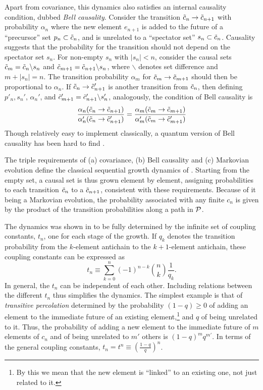 Apart from covariance, this  dynamics also satisfies an internal causality condition, dubbed  \emph{Bell
  causality}.   Consider the transition $\tilde c_n \rightarrow \tilde c_{n+1}$ with probability $\alpha_n$ where  the new element
$e_{n+1}$ is added to the future of a
``precursor''   set $p_n \subset \tilde c_n$, and is unrelated to a ``spectator set'' $s_n \subset \tilde c_n$.  Causality suggests
that the 
probability for the transition should not depend on the spectator set $s_n$.  For non-empty $s_n$ with
$|s_n|<n$,  consider
the causal sets $\tilde c_m=\tilde c_n\backslash s_n$
and $\tilde c_{m+1}=\tilde c_{n+1} \backslash s_n$,  
where $\backslash$ denotes set difference  and $m+|s_n| =n$.  The  transition probability $\alpha_m$ for  $\tilde c_m\rightarrow
\tilde c_{m+1}$   should then be proportional to $\alpha_n$. If $\tilde c_n \rightarrow \tilde c_{n+1}'$ is another transition from $\tilde c_n$, then
defining $p'_n, s_n'$, $ \alpha_n'$, and $\tilde c_{m+1}'=\tilde c_{n+1}'\backslash s_n'$, analogously, the condition of Bell
causality is 
\begin{equation}
\frac{\alpha_n(\tilde c_n \rightarrow \tilde c_{n+1})}{\alpha_n'(\tilde c_n \rightarrow \tilde c_{n+1}')}= \frac{\alpha_m(\tilde c_m \rightarrow
  \tilde c_{m+1})}{\alpha_m'(\tilde c_m \rightarrow \tilde c_{m+1}')} 
\end{equation}
Though relatively easy to implement classically, a quantum version of Bell causality has been hard to find 
\citep{joequantumbell}.    

The triple requirements of (a) covariance, (b) Bell causality and (c) Markovian evolution define the classical
sequential growth dynamics of \cite{csgone}.  Starting from the empty set, a causal set is thus grown element by
element, assigning probabilities to each transition $\tilde c_n$ to a $\tilde c_{n+1}$, consistent with these requirements. Because of
it being a Markovian evolution, the probability associated with any finite $c_n$ is given by the product of the
transition probabilities along a path in $\mathcal P$.   

The dynamics was shown in \cite{csg} to be  fully determined by the infinite set of coupling constants, $t_n$, one for
each stage of the growth. If  $q_k$ denotes  the transition probability from  the $k$-element antichain to the $k+1$-element
antichain, these  coupling constants can be expressed as 
\begin{equation}
t_n\equiv  \sum_{k=0}^n (-1)^{n-k} \binom{n}{k}\frac{1}{q_k}.
  \end{equation}  
In general, the $t_n$  can be independent of each other. Including relations between the different $t_n$ thus simplifies  the dynamics. The simplest example is that of \emph{transitive percolation}
determined by the probability  $(1-q) \geq 0$ of adding an element to the immediate future of an existing element,\footnote{By this we mean that the new
  element is ``linked'' to an existing one, not just related to it.} and $q$ of
being unrelated to it.  Thus, the
probability of adding a new element to the immediate future of $m$ elements of   $c_n$ and of being  unrelated to  $m'$ others
is $(1-q)^mq^{m'}$.  In terms of the general coupling constants,  $t_n=t^n\equiv \left(\frac{1-q}{q}\right)^n$.

